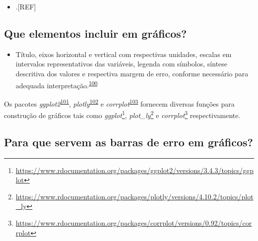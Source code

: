 \documentclass[
  a4paper,
]{book}
\providecommand{\tightlist}{%
  \setlength{\itemsep}{0pt}\setlength{\parskip}{0pt}}
\renewcommand{\href}[2]{#2\footnote{\url{#1}}}
\newenvironment{infobox}[1]
  {
  \begin{itemize}
  \renewcommand{\labelitemi}{
    \raisebox{-.7\height}[0pt][0pt]{
      {\setkeys{Gin}{width=3em,keepaspectratio}
        \texttt{[image: \#1]}}
    }
  }
  \setlength{\fboxsep}{1em}
  \begin{blackbox}
  \item
  }
  {
  \end{blackbox}
  \end{itemize}
  }
\begin{document}
\begin{itemize}
\tightlist
\item
  .{[}REF{]}
\end{itemize}

\hypertarget{que-elementos-incluir-em-gruxe1ficos}{%
\subsection{Que elementos incluir em gráficos?}\label{que-elementos-incluir-em-gruxe1ficos}}

\begin{itemize}
\tightlist
\item
  Título, eixos horizontal e vertical com respectivas unidades, escalas em intervalos representativos das variáveis, legenda com símbolos, síntese descritiva dos valores e respectiva margem de erro, conforme necessário para adequada interpretação.\textsuperscript{\protect\hyperlink{ref-Park2022}{100}}
\end{itemize}

\begin{infobox}{images/Rlogo}
Os pacotes \emph{ggplot2}\textsuperscript{\protect\hyperlink{ref-ggplot2}{101}}, \emph{plotly}\textsuperscript{\protect\hyperlink{ref-plotly}{102}} e \emph{corrplot}\textsuperscript{\protect\hyperlink{ref-corrplot}{103}} fornecem diversas funções para construção de gráficos tais como \href{https://www.rdocumentation.org/packages/ggplot2/versions/3.4.3/topics/ggplot}{\emph{ggplot}}, \href{https://www.rdocumentation.org/packages/plotly/versions/4.10.2/topics/plot_ly}{\emph{plot\_ly}} e \href{https://www.rdocumentation.org/packages/corrplot/versions/0.92/topics/corrplot}{\emph{corrplot}} respectivamente.

\end{infobox}

\hypertarget{para-que-servem-as-barras-de-erro-em-gruxe1ficos}{%
\subsection{Para que servem as barras de erro em gráficos?}\label{para-que-servem-as-barras-de-erro-em-gruxe1ficos}}
\end{document}
